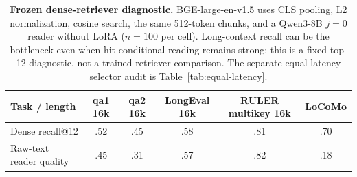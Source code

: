 \begin{table}[!t]
\centering
\small
\setlength{\tabcolsep}{3.2pt}
\begin{tabular}{@{}lccccc@{}}
\toprule
\textbf{Task / length} & \textbf{qa1 16k} & \textbf{qa2 16k} &
\textbf{LongEval 16k} & \textbf{RULER multikey 16k} & \textbf{LoCoMo} \\
\midrule
Dense recall@12 & .52 & .45 & .58 & .81 & .70 \\
Raw-text reader quality & .45 & .31 & .57 & .82 & .18 \\
\bottomrule
\end{tabular}
\caption{\textbf{Frozen dense-retriever diagnostic.} BGE-large-en-v1.5 uses
CLS pooling, L2 normalization, cosine search, the same 512-token chunks, and a
Qwen3-8B $j{=}0$ reader without LoRA ($n{=}100$ per cell). Long-context recall
can be the bottleneck even when hit-conditional reading remains strong; this is
a fixed top-12 diagnostic, not a trained-retriever comparison. The separate
equal-latency selector audit is Table~\ref{tab:equal-latency}.}
\label{tab:dense-retriever}
\end{table}
